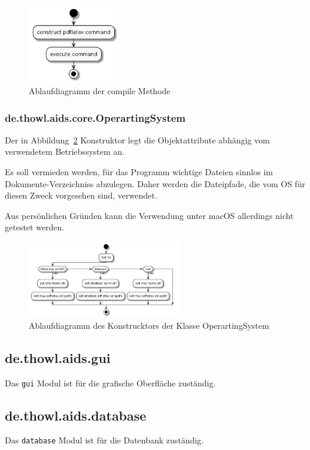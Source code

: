 \documentclass[stu, a4paper, 11pt, floatsintext]{apa7}
\begin{document}
\begin{figure}[!htbp]
\centering
\includegraphics[width=150px]{../technical_documentation/diagramm/uml/flowcharts/core/latex/compile.png}
\caption{\label{compile-methode}Ablaufdiagramm der compile Methode}
\end{figure}

\clearpage

\subsubsection{de.thowl.aids.core.OperartingSystem}
\noindent Der in Abbildung~\ref{os-construcktor} Konstruktor legt die Objektattribute abhängig vom verwendetem Betriebssystem an.

Es soll vermieden werden, für das Programm wichtige Dateien sinnlos im Dokumente-Verzeichniss abzulegen. Daher werden die Dateipfade, die vom OS für diesen Zweck vorgesehen sind, verwendet.

Aus persönlichen Gründen kann die Verwendung unter macOS allerdings nicht getestet werden.

\begin{figure}[!htbp]
\centering
\includegraphics[width=250px]{../technical_documentation/diagramm/uml/flowcharts/core/os/construcktor.png}
\caption{\label{os-construcktor}Ablaufdiagramm des Konstrucktors der Klasse OperartingSystem}
\end{figure}

\subsection{de.thowl.aids.gui}
\noindent Das \texttt{gui} Modul ist für die grafische Oberfläche zuständig.

\subsection{de.thowl.aids.database}
\noindent Das \texttt{database} Modul ist für die Datenbank zuständig.
\end{document}
